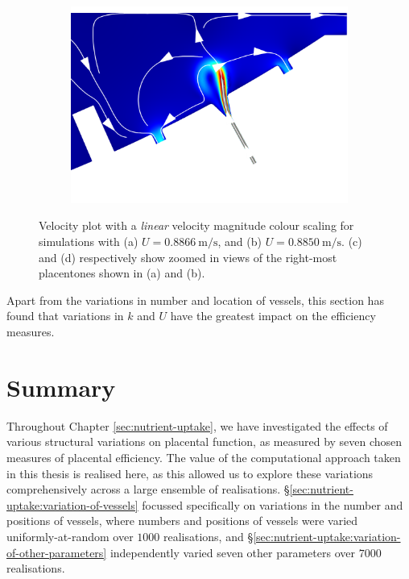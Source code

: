 \begin{figure}
\begin{subfigure}{0.45\textwidth}
                    \caption{}
                    \label{fig:bifurcations:452-zoom}
                \end{subfigure}
                \hfill
                \begin{subfigure}{0.45\textwidth}
                    \centering
                    \includegraphics[width=\textwidth]{diagrams/results-variations/bifurcation-512-zoom.png}
                    \caption{}
                    \label{fig:bifurcations:512-zoom}
                \end{subfigure}

                \caption{Velocity plot with a \textit{linear} velocity magnitude colour scaling for simulations with (a) $U = \qty{0.8866}{\metre\per\second}$, and (b) $ U = \qty{0.8850}{\metre\per\second}$. (c) and (d) respectively show zoomed in views of the right-most placentones shown in (a) and (b).}
                \label{fig:bifurcations}
            \end{figure}

            Apart from the variations in number and location of vessels, this section has found that variations in $k$ and $U$ have the greatest impact on the efficiency measures.

    \section{Summary} \label{sec:nutrient-uptake:summary}  
        Throughout Chapter \ref{sec:nutrient-uptake}, we have investigated the effects of various structural variations on placental function, as measured by seven chosen measures of placental efficiency. The value of the computational approach taken in this thesis is realised here, as this allowed us to explore these variations comprehensively across a large ensemble of realisations. \S\ref{sec:nutrient-uptake:variation-of-vessels} focussed specifically on variations in the number and positions of vessels, where numbers and positions of vessels were varied uniformly-at-random over $1000$ realisations, and \S\ref{sec:nutrient-uptake:variation-of-other-parameters} independently varied seven other parameters over $7000$ realisations.

